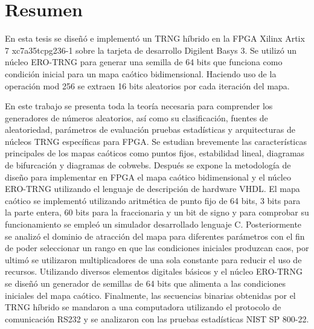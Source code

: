 \chapter{Resumen}
    
    En esta tesis se diseñó e implementó un TRNG híbrido en la FPGA Xilinx Artix 7 xc7a35tcpg236-1 sobre la tarjeta de desarrollo Digilent Basys 3. Se utilizó un núcleo ERO-TRNG para generar una semilla de 64 bits que funciona como condición inicial para un mapa caótico bidimensional. Haciendo uso de la operación mod 256 se extraen 16 bits aleatorios por cada iteración del mapa. 

    En este trabajo se presenta toda la teoría necesaria para comprender los generadores de números aleatorios, así como su clasificación, fuentes de aleatoriedad, parámetros de evaluación pruebas estadísticas y arquitecturas de núcleos TRNG específicas para FPGA. Se estudian brevemente las características principales de los mapas caóticos como puntos fijos, estabilidad lineal, diagramas de bifurcación y diagramas de cobwebs. Después se expone la metodología de diseño para implementar en FPGA el mapa caótico bidimensional y el núcleo ERO-TRNG utilizando el lenguaje de descripción de hardware VHDL. El mapa caótico se implementó utilizando aritmética de punto fijo de 64 bits, 3 bits para la parte entera, 60 bits para la fraccionaria y un bit de signo y para comprobar su funcionamiento se empleó un simulador desarrollado lenguaje C. Posteriormente se analizó el dominio de atracción del mapa para diferentes parámetros con el fin de poder seleccionar un rango en que las condiciones iniciales produzcan caos, por ultimó se utilizaron multiplicadores de una sola constante para reducir el uso de recursos. Utilizando diversos elementos digitales básicos y el núcleo ERO-TRNG se diseñó un generador de semillas de 64 bits que alimenta a las condiciones iniciales del mapa caótico. Finalmente, las secuencias binarias obtenidas por el TRNG híbrido se mandaron a una computadora utilizando el protocolo de comunicación RS232 y se analizaron con las pruebas estadísticas NIST SP 800-22.
